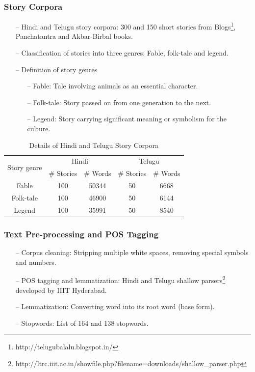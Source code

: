 \documentclass{beamer}
\begin{document}
\begin{frame}
\frametitle{Story Corpora}
\begin{itemize}
\item[--] Hindi and Telugu story corpora: 300 and 150 short stories from Blogs\footnote{http://telugubalalu.blogspot.in/}, Panchatantra and Akbar-Birbal books.  
\item[--] Classification of stories into three genres: Fable, folk-tale and legend.
\item[--] Definition of story genres
\begin{itemize}
\item[--] Fable: Tale involving animals as an essential character.
\item[--] Folk-tale: Story passed on from one generation to the next. 
\item[--] Legend: Story carrying significant meaning or symbolism for the culture.
\end{itemize}
\end{itemize}

\begin{table}[h]
\renewcommand{\arraystretch}{1}
\footnotesize\setlength{\tabcolsep}{8pt}
\caption {Details of Hindi and Telugu Story Corpora\label{corpus}}
\centering
\begin{tabular}{|c|c|c|c|c|}
\hline
\multirow{2}{*}{Story genre} & \multicolumn{2}{c|}{Hindi} & \multicolumn{2}{c|}{Telugu} \\ \cline{2-5} 
 & \# Stories & \# Words & \# Stories & \# Words \\ \hline
Fable & 100 & 50344 & 50 & 6668  \\ \hline
Folk-tale & 100 & 46900 & 50 & 6144  \\ \hline
Legend & 100 & 35991 & 50 & 8540  \\ \hline
\end{tabular}
\end{table}

\end{frame}

\begin{frame}
\frametitle{Text Pre-processing and POS Tagging}
\begin{itemize}
\item[--] Corpus cleaning: Stripping multiple white spaces, removing special symbols and numbers.
\item[--] POS tagging and lemmatization: Hindi and Telugu shallow parsers\footnote{http://ltrc.iiit.ac.in/showfile.php?filename=downloads/shallow\_parser.php} developed by IIIT Hyderabad.
\item[--] Lemmatization: Converting word into its root word (base form).
\item[--] Stopwords: List of 164 and 138 stopwords.
\end{itemize}
\end{frame}
\end{document}
